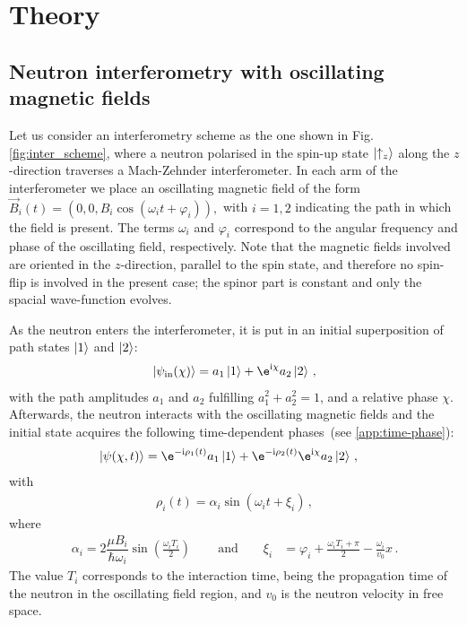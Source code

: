 \documentclass[12pt]{iopart}
\newcommand{\fig}{Fig.}
\newcommand{\I}{\mathrm{i}}
\begin{document}
\section{Theory}\label{sec:Theory}
\subsection{Neutron interferometry with oscillating magnetic fields}\label{subsec:interferometry}
Let us consider an interferometry scheme as the one shown in \fig\,\ref{fig:inter_scheme}, where a neutron polarised in the spin-up state $\ket{\uparrow_z}$ along the $z$-direction traverses a Mach-Zehnder interferometer. In each arm of the interferometer we place an oscillating magnetic field of the form $\Vec{B}_i(t)= 
        \left(0, 0, B_i\cos(\omega_i t + \varphi_i) \right),$
with $i=1,2$ indicating the path in which the field is present. The terms $\omega_i$ and $\varphi_i$ correspond to the angular frequency and phase of the oscillating field, respectively. Note that the magnetic fields involved are oriented in the $z$-direction, parallel to the spin state, and therefore no spin-flip is involved 
in the present case; the spinor part is constant and only the spacial wave-function evolves.

As the neutron enters the interferometer, it is put in an initial superposition of path states $\ket{1}$ and $\ket{2}$:
\begin{align}
    \ket{\psi_\mathrm{in}(\chi)}= a_1 
    \ket{1} +
    \e^{\I \chi}a_2 \ket{2} \,,
    \label{eq:psi_i}
\end{align}
with the path amplitudes $a_1$ and $a_2$ fulfilling $a_1^2+a_2^2=1$, and a relative phase $\chi$. Afterwards, the neutron interacts with the oscillating magnetic fields and the initial state acquires the following time-dependent phases\,\cite{summhammer1995,summhammer1993, sulyok2011, Haavig1982} (see \ref{app:time-phase}):
\begin{align}
\begin{aligned}
    \ket{\psi(\chi,t)} &= \e^{-\I \rho_1(t)} a_1 
    \ket{1} +
   \e^{-\I \rho_2(t)} \e^{\I \chi} a_2 \ket{2} \, ,
\end{aligned} \label{eq:psi}
\end{align}
with
\begin{align}
    \rho_i(t)=\alpha_i \sin(\omega_i t+\xi_i)\,,
    \label{eq:rho_i}
\end{align}
where
\begin{align}
    \alpha_i= 2\dfrac{\mu B_i}{\hbar \omega_i} \sin\left(\frac{\omega_i T_i}{2}\right) \, 
\qquad \mathrm{and} \qquad
        \xi_i&=\varphi_i+\frac{\omega_i T_i+\pi}{2}-\frac{\omega_i}{v_0}x \, .
    \label{eq:alpha xi}
\end{align}
The value $T_i$ corresponds to the interaction time, being the propagation time of the neutron in the oscillating field region, and $v_0$ is the neutron velocity in free space. 
\end{document}
